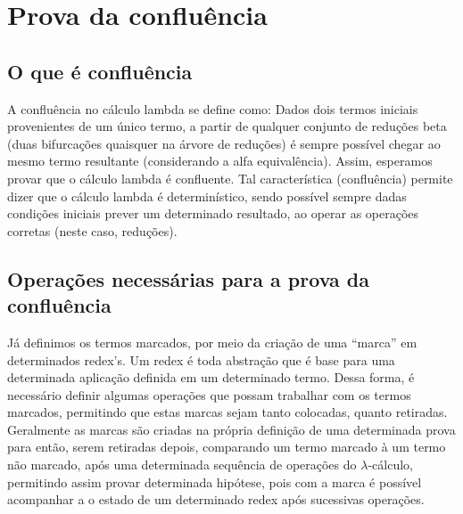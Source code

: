 \section{Prova da confluência}



\subsection{O que é confluência}



 A confluência no cálculo lambda se define como: Dados dois termos iniciais provenientes de um único termo,
a partir de qualquer conjunto de reduções beta (duas bifurcações quaisquer na árvore de reduções)
 é sempre possível chegar ao mesmo termo resultante (considerando a alfa equivalência). 
Assim, esperamos provar que o cálculo lambda é confluente. Tal característica (confluência) 
permite dizer que o cálculo lambda é determinístico, sendo possível sempre dadas condições iniciais
prever um determinado resultado, ao operar as operações corretas (neste caso, reduções). 

\subsection{Operações necessárias para a prova da confluência}



 Já definimos os termos marcados, por meio da criação de uma ``marca'' em determinados redex's. Um
redex é toda abstração que é base para uma determinada aplicação definida em um determinado termo. Dessa forma, é
necessário definir algumas operações que possam trabalhar com os termos marcados, permitindo que estas marcas
sejam tanto colocadas, quanto retiradas. Geralmente as marcas são criadas na própria definição de uma determinada prova
para então, serem retiradas depois, comparando um termo marcado à um termo não marcado, após uma determinada
sequência de operações do $\lambda$-cálculo, permitindo assim provar determinada hipótese, pois com a marca
é possível acompanhar a o estado de um determinado redex após sucessivas operações. 

